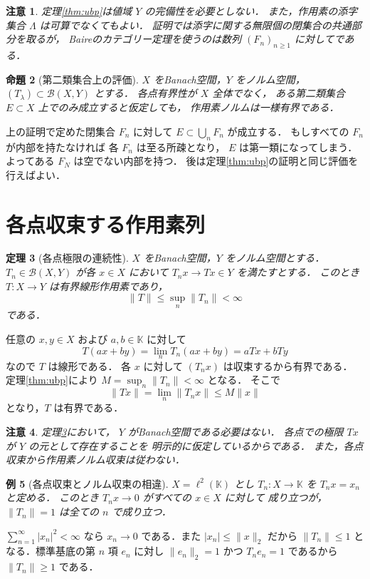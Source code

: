 \documentclass[a5paper,10pt,onecolumn]{jsarticle}
\makeatletter
\theoremstyle{mathnotetheorem}
\newtheorem{theorem}{定理}[section]
\newtheorem{proposition}[theorem]{命題}
\newtheorem{example}[theorem]{例}
\newtheorem{remark}[theorem]{注意}
\renewcommand{\proofname}{証明}
\renewenvironment{proof}[1][\proofname]{%
  \par\pushQED{\qed}\normalfont\topsep4\p@\@plus2\p@\relax
  \trivlist\item[\hskip\labelsep\bfseries #1]\ignorespaces
}{\popQED\endtrivlist\@endpefalse}
\makeatother
\begin{document}
\begin{remark}
定理\ref{thm:ubp}は値域 $Y$ の完備性を必要としない．
また，作用素の添字集合 $\Lambda$ は可算でなくてもよい．
証明では添字に関する無限個の閉集合の共通部分を取るが，
Baireのカテゴリー定理を使うのは数列 $(F_n)_{n\ge1}$
に対してである．
\end{remark}

\begin{proposition}[第二類集合上の評価]\label{prop:second-category}
$X$ をBanach空間，$Y$ をノルム空間，
$(T_\lambda)\subset\mathcal B(X,Y)$ とする．
各点有界性が $X$ 全体でなく，
ある第二類集合 $E\subset X$ 上でのみ成立すると仮定しても，
作用素ノルムは一様有界である．
\end{proposition}
\begin{proof}
上の証明で定めた閉集合 $F_n$ に対して
$E\subset\bigcup_nF_n$ が成立する．
もしすべての $F_n$ が内部を持たなければ
各 $F_n$ は至る所疎となり，
$E$ は第一類になってしまう．
よってある $F_N$ は空でない内部を持つ．
後は定理\ref{thm:ubp}の証明と同じ評価を行えばよい．
\end{proof}

\section{各点収束する作用素列}

\begin{theorem}[各点極限の連続性]\label{thm:pointwise-limit}
$X$ をBanach空間，$Y$ をノルム空間とする．
$T_n\in\mathcal B(X,Y)$ が各 $x\in X$ において
$T_nx\to Tx\in Y$ を満たすとする．
このとき $T:X\to Y$ は有界線形作用素であり，
\[
 \|T\|\le\sup_n\|T_n\|<\infty
\]
である．
\end{theorem}
\begin{proof}
任意の $x,y\in X$ および $a,b\in\mathbb K$ に対して
\[
 T(ax+by)=\lim_nT_n(ax+by)
 =aTx+bTy
\]
なので $T$ は線形である．
各 $x$ に対して $(T_nx)$ は収束するから有界である．
定理\ref{thm:ubp}により
$M=\sup_n\|T_n\|<\infty$ となる．
そこで
\[
 \|Tx\|=\lim_n\|T_nx\|
 \le M\|x\|
\]
となり，$T$ は有界である．
\end{proof}

\begin{remark}
定理\ref{thm:pointwise-limit}において，
$Y$ がBanach空間である必要はない．
各点での極限 $Tx$ が $Y$ の元として存在することを
明示的に仮定しているからである．
また，各点収束から作用素ノルム収束は従わない．
\end{remark}

\begin{example}[各点収束とノルム収束の相違]\label{ex:coordinate}
$X=\ell^2(\mathbb K)$ とし
$T_n:X\to\mathbb K$ を $T_nx=x_n$ と定める．
このとき $T_nx\to0$ がすべての $x\in X$ に対して
成り立つが，$\|T_n\|=1$ は全ての $n$ で成り立つ．
\end{example}
\begin{proof}
$\sum_{n=1}^\infty|x_n|^2<\infty$ なら
$x_n\to0$ である．また $|x_n|\le\|x\|_2$ だから
$\|T_n\|\le1$ となる．標準基底の第 $n$ 項 $e_n$ に対し
$\|e_n\|_2=1$ かつ $T_ne_n=1$ であるから
$\|T_n\|\ge1$ である．
\end{proof}
\end{document}
